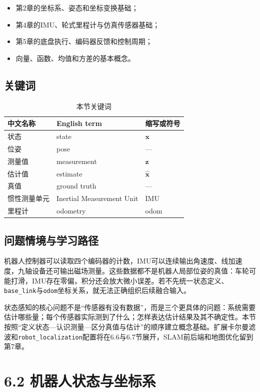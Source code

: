 \documentclass[UTF8,zihao=-4]{ctexart}
\newcommand{\vect}[1]{\bm{#1}}
\begin{document}
\begin{itemize}
  \item 第2章的坐标系、姿态和坐标变换基础；
  \item 第4章的IMU、轮式里程计与仿真传感器基础；
  \item 第5章的底盘执行、编码器反馈和控制周期；
  \item 向量、函数、均值和方差的基本概念。
\end{itemize}

\subsection*{关键词}

\begin{table}[htbp]
  \centering
  \caption*{本节关键词}
  \begin{tabular}{lll}
    \toprule
    中文名称 & English term & 缩写或符号 \\
    \midrule
    状态 & state & $\vect{x}$ \\
    位姿 & pose & --- \\
    测量值 & measurement & $\vect{z}$ \\
    估计值 & estimate & $\hat{\vect{x}}$ \\
    真值 & ground truth & --- \\
    惯性测量单元 & Inertial Measurement Unit & IMU \\
    里程计 & odometry & odom \\
    \bottomrule
  \end{tabular}
\end{table}

\subsection*{问题情境与学习路径}

机器人控制器可以读取四个编码器的计数，IMU可以连续输出角速度、线加速度，九轴设备还可输出磁场测量。这些数据都不是机器人局部位姿的真值：车轮可能打滑，IMU存在零偏，积分还会放大微小误差。若不先统一状态定义、\texttt{base\_link}与\texttt{odom}坐标关系，就无法正确组织后续融合输入。

状态感知的核心问题不是“传感器有没有数据”，而是三个更具体的问题：系统需要估计哪些量；每个传感器实际测到了什么；怎样表达估计结果及其不确定性。本节按照“定义状态---认识测量---区分真值与估计”的顺序建立概念基础。扩展卡尔曼滤波和\texttt{robot\_localization}配置将在6.6与6.7节展开，SLAM前后端和地图优化留到第7章。

\section*{6.2 机器人状态与坐标系}
\end{document}
